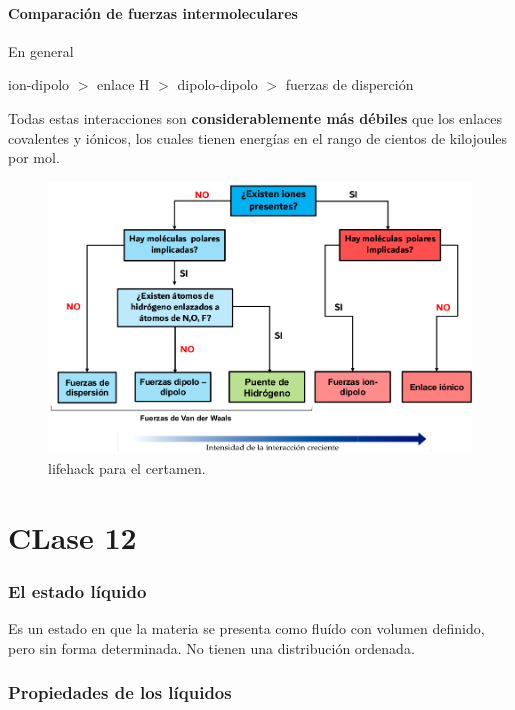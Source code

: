 \documentclass[]{article}
\begin{document}
\subsection{Comparación de fuerzas intermoleculares} 
En general

\begin{center}
ion-dipolo $>$ enlace H $>$ dipolo-dipolo $>$ fuerzas de disperción 
\end{center}

Todas estas interacciones son \textbf{considerablemente más débiles} que los enlaces covalentes y iónicos, los cuales tienen energías en el rango de cientos de kilojoules por
mol.

\begin{figure}[H]
\center
\includegraphics[scale=0.36]{foto9.png}
\caption{lifehack para el certamen.}
\end{figure}



\part{CLase 12}



\section{El estado líquido}
Es un estado en que la materia se presenta como fluído con volumen definido, pero sin forma determinada. No tienen una distribución ordenada.



\section{Propiedades de los líquidos}
\end{document}
